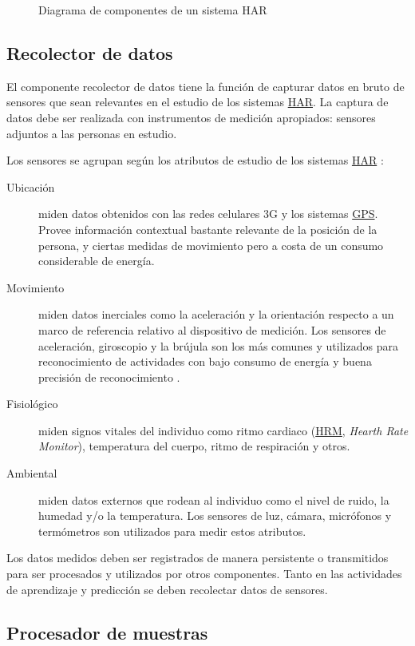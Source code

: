 \begin{figure}
\caption{Diagrama de componentes de un sistema HAR}

\end{figure}


\subsection{Recolector de datos}

El componente recolector de datos tiene la función de capturar datos
en bruto de sensores que sean relevantes en el estudio de los sistemas
\hyperlink{abbr}{HAR}. La captura de datos debe ser realizada con
instrumentos de medición apropiados: sensores adjuntos a las personas
en estudio. 

Los sensores se agrupan según los atributos de estudio de los sistemas
\hyperlink{abbr}{HAR} \cite{LaraLabrador2013}:
\begin{description}
\item [{Ubicación}] miden datos obtenidos con las redes celulares 3G y
los sistemas \hyperlink{abbr}{GPS}. Provee información contextual
bastante relevante de la posición de la persona, y ciertas medidas
de movimiento pero a costa de un consumo considerable de energía.
\item [{Movimiento}] miden datos inerciales como la aceleración y la orientación
respecto a un marco de referencia relativo al dispositivo de medición.
Los sensores de aceleración, giroscopio y la brújula son los más comunes
y utilizados para reconocimiento de actividades con bajo consumo de
energía y buena precisión de reconocimiento \cite{Bao2004,LaraLabrador2012}.
\item [{Fisiológico}] miden signos vitales del individuo como ritmo cardiaco
(\hyperlink{abbr}{HRM}, \emph{Hearth Rate Monitor}), temperatura
del cuerpo, ritmo de respiración y otros.
\item [{Ambiental}] miden datos externos que rodean al individuo como el
nivel de ruido, la humedad y/o la temperatura. Los sensores de luz,
cámara, micrófonos y termómetros son utilizados para medir estos atributos. 
\end{description}
Los datos medidos deben ser registrados de manera persistente o transmitidos
para ser procesados y utilizados por otros componentes. Tanto en las
actividades de aprendizaje y predicción se deben recolectar datos
de sensores.

\subsection{Procesador de muestras}

